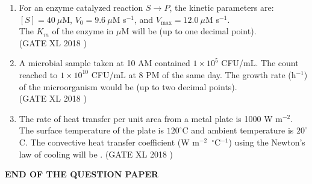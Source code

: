 \documentclass[14pt]{extarticle}
\begin{document}
\begin{flushleft}
\begin{enumerate}
\begin{enumerate}[label=(\Alph*)]
\end{enumerate}

\item For an enzyme catalyzed reaction $S \rightarrow P$, the kinetic parameters are: \\
$[S] = 40\ \mu$M, $V_0 = 9.6\ \mu$M s$^{-1}$, and $V_{\max} = 12.0\ \mu$M s$^{-1}$. \\
The $K_m$ of the enzyme in $\mu$M will be \underline{\hspace{2cm}} (up to one decimal point).\\
\hfill(GATE XL 2018 )\\


\item A microbial sample taken at 10 AM contained $1\times 10^5$ CFU/mL. The count reached to $1\times 10^{10}$ CFU/mL at 8 PM of the same day. The growth rate (h$^{-1}$) of the microorganism would be \underline{\hspace{2cm}} (up to two decimal points).\\
\hfill(GATE XL 2018 )\\

\item The rate of heat transfer per unit area from a metal plate is 1000 W m$^{-2}$. The surface temperature of the plate is $120^\circ$C and ambient temperature is $20^\circ$C. The convective heat transfer coefficient (W m$^{-2}$~$^\circ$C$^{-1}$) using the Newton's law of cooling will be \underline{\hspace{2cm}}.
\hfill(GATE XL 2018 )\\

\end{enumerate}
\begin{center}
    \textbf{END OF THE QUESTION PAPER}
\end{center}

\end{flushleft}
\end{document}
